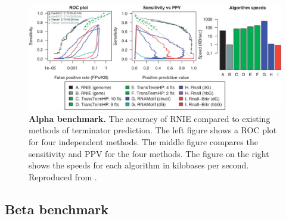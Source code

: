\begin{figure}[htp]
\begin{center}
\includegraphics[width=14cm]{alpha.jpg}
\caption[Alpha benchmark]{\textbf{Alpha benchmark.} The accuracy of RNIE compared to existing methods of terminator prediction. The left figure shows a ROC plot for four independent methods. The middle figure compares the sensitivity and PPV for the four methods. The figure on the right shows the speeds for each algorithm in kilobases per second. Reproduced from \textcite{Gardner2011a}.
} 
\label{fig:alpha}
\end{center}
\end{figure}

\subsection{Beta benchmark}



